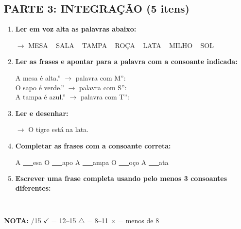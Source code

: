 \begin{exercicio}
\subsection*{PARTE 3: INTEGRAÇÃO (5 itens)}

\begin{enumerate}[resume]
  \item \textbf{Ler em voz alta as palavras abaixo:}
  \begin{center}
  $\rightarrow$ MESA  ~  SALA  ~  TAMPA  ~  ROÇA  ~  LATA  ~  MILHO  ~  SOL
  \end{center}

  \item \textbf{Ler as frases e apontar para a palavra com a consoante indicada:}
  \begin{center}
  A mesa é alta.'' $\rightarrow$ palavra com M'': \underline{\hspace{3cm}} \\
  O sapo é verde.'' $\rightarrow$ palavra com S'': \underline{\hspace{3cm}} \\
  A tampa é azul.'' $\rightarrow$ palavra com T'': \underline{\hspace{3cm}}
  \end{center}

  \item \textbf{Ler e desenhar:}
  \begin{center}
  $\rightarrow$ O tigre está na lata.
  \end{center}
  \begin{center}
  \end{center}

  \item \textbf{Completar as frases com a consoante correta:}
  \begin{center}
  A \underline{~~~}esa \quad O \underline{~~~}apo \quad A \underline{~~~}ampa \quad O \underline{~~~}oço \quad A \underline{~~~}ata
  \end{center}

  \item \textbf{Escrever uma frase completa usando pelo menos 3 consoantes diferentes:}
  \begin{center}
  \underline{\hspace{12cm}} \\
  \underline{\hspace{12cm}}
  \end{center}
\end{enumerate}

\noindent\textbf{NOTA:} \underline{\hspace{1cm}}/15 \quad $\checkmark$ = 12--15 \quad $\triangle$ = 8--11 \quad $\times$ = menos de 8
\end{exercicio}

